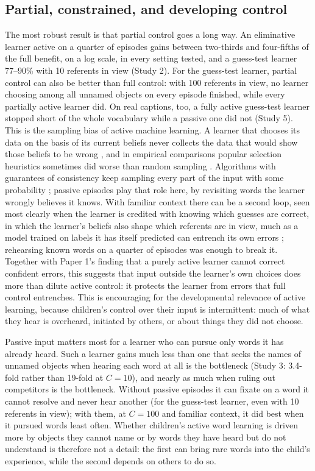 \documentclass[a4paper,natbib,man]{apa6}
\begin{document}
\subsection{Partial, constrained, and developing control}
The most robust result is that partial control goes a long way. An eliminative learner active on a quarter of episodes gains between two-thirds and four-fifths of the full benefit, on a log scale, in every setting tested, and a guess-test learner 77--90\% with 10 referents in view (Study 2). For the guess-test learner, partial control can also be better than full control: with 100 referents in view, no learner choosing among all unnamed objects on every episode finished, while every partially active learner did. On real captions, too, a fully active guess-test learner stopped short of the whole vocabulary while a passive one did not (Study 5). This is the sampling bias of active machine learning. A learner that chooses its data on the basis of its current beliefs never collects the data that would show those beliefs to be wrong \citep{Dasgupta:2008,Dasgupta:2011}, and in empirical comparisons popular selection heuristics sometimes did worse than random sampling \citep{Schein:2007}. Algorithms with guarantees of consistency keep sampling every part of the input with some probability \citep{Beygelzimer:2009}; passive episodes play that role here, by revisiting words the learner wrongly believes it knows. With familiar context there can be a second loop, seen most clearly when the learner is credited with knowing which guesses are correct, in which the learner's beliefs also shape which referents are in view, much as a model trained on labels it has itself predicted can entrench its own errors \citep{Arazo:2020}; rehearsing known words on a quarter of episodes was enough to break it. Together with Paper 1's finding that a purely active learner cannot correct confident errors, this suggests that input outside the learner's own choices does more than dilute active control: it protects the learner from errors that full control entrenches. This is encouraging for the developmental relevance of active learning, because children's control over their input is intermittent: much of what they hear is overheard, initiated by others, or about things they did not choose.

Passive input matters most for a learner who can pursue only words it has already heard. Such a learner gains much less than one that seeks the names of unnamed objects when hearing each word at all is the bottleneck (Study 3: 3.4-fold rather than 19-fold at $C=10$), and nearly as much when ruling out competitors is the bottleneck. Without passive episodes it can fixate on a word it cannot resolve and never hear another (for the guess-test learner, even with 10 referents in view); with them, at $C=100$ and familiar context, it did best when it pursued words least often. Whether children's active word learning is driven more by objects they cannot name or by words they have heard but do not understand is therefore not a detail: the first can bring rare words into the child's experience, while the second depends on others to do so.
\end{document}
